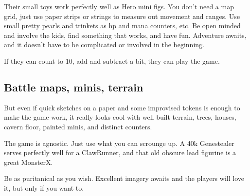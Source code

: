 Their small toys work perfectly well as Hero mini figs. You don't need a map grid, just use paper strips or strings to measure out movement and ranges. Use small pretty pearls and trinkets as hp and mana counters, etc. Be open minded and involve the kids, find something that works, and have fun. Adventure awaits, and it doesn't have to be complicated or involved in the beginning.

If they can count to 10, add and subtract a bit, they can play the game.


\subsection*{Battle maps, minis, terrain}

But even if quick sketches on a paper and some improvised tokens is enough to make the game work, it really looks cool with well built terrain, trees, houses, cavern floor, painted minis, and distinct counters.

The game is agnostic. Just use what you can scrounge up. A 40k Genestealer serves perfectly well for a ClawRunner, and that old obscure lead figurine is a great MonsterX.

Be as puritanical as you wish. Excellent imagery awaits and the players will love it, but only if you want to.







